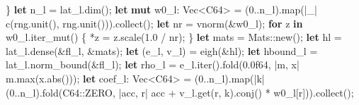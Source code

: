 \documentclass[
  10pt,
]{article}
\newenvironment{Shaded}{}{}
\newcommand{\ControlFlowTok}[1]{\textcolor[rgb]{0.00,0.44,0.13}{\textbf{#1}}}
\newcommand{\DataTypeTok}[1]{\textcolor[rgb]{0.56,0.13,0.00}{#1}}
\newcommand{\DecValTok}[1]{\textcolor[rgb]{0.25,0.63,0.44}{#1}}
\newcommand{\KeywordTok}[1]{\textcolor[rgb]{0.00,0.44,0.13}{\textbf{#1}}}
\newcommand{\NormalTok}[1]{#1}
\newcommand{\OperatorTok}[1]{\textcolor[rgb]{0.40,0.40,0.40}{#1}}
\newcommand{\PreprocessorTok}[1]{\textcolor[rgb]{0.74,0.48,0.00}{#1}}
\begin{document}
\begin{Shaded}
\begin{Highlighting}[]
    \OperatorTok{\}}
    \KeywordTok{let}\NormalTok{ n\_l }\OperatorTok{=}\NormalTok{ lat\_l}\OperatorTok{.}\NormalTok{dim()}\OperatorTok{;}
    \KeywordTok{let} \KeywordTok{mut}\NormalTok{ w0\_l}\OperatorTok{:} \DataTypeTok{Vec}\OperatorTok{\textless{}}\NormalTok{C64}\OperatorTok{\textgreater{}} \OperatorTok{=}\NormalTok{ (}\DecValTok{0}\OperatorTok{..}\NormalTok{n\_l)}\OperatorTok{.}\NormalTok{map(}\OperatorTok{|}\NormalTok{\_}\OperatorTok{|}\NormalTok{ c(rng}\OperatorTok{.}\NormalTok{unit()}\OperatorTok{,}\NormalTok{ rng}\OperatorTok{.}\NormalTok{unit()))}\OperatorTok{.}\NormalTok{collect()}\OperatorTok{;}
    \KeywordTok{let}\NormalTok{ nr }\OperatorTok{=}\NormalTok{ vnorm(}\OperatorTok{\&}\NormalTok{w0\_l)}\OperatorTok{;}
    \ControlFlowTok{for}\NormalTok{ z }\KeywordTok{in}\NormalTok{ w0\_l}\OperatorTok{.}\NormalTok{iter\_mut() }\OperatorTok{\{}
        \OperatorTok{*}\NormalTok{z }\OperatorTok{=}\NormalTok{ z}\OperatorTok{.}\NormalTok{scale(}\DecValTok{1.0} \OperatorTok{/}\NormalTok{ nr)}\OperatorTok{;}
    \OperatorTok{\}}
    \KeywordTok{let}\NormalTok{ mats }\OperatorTok{=} \PreprocessorTok{Mats::}\NormalTok{new()}\OperatorTok{;}
    \KeywordTok{let}\NormalTok{ hl }\OperatorTok{=}\NormalTok{ lat\_l}\OperatorTok{.}\NormalTok{dense(}\OperatorTok{\&}\NormalTok{fl\_l}\OperatorTok{,} \OperatorTok{\&}\NormalTok{mats)}\OperatorTok{;}
    \KeywordTok{let}\NormalTok{ (e\_l}\OperatorTok{,}\NormalTok{ v\_l) }\OperatorTok{=}\NormalTok{ eigh(}\OperatorTok{\&}\NormalTok{hl)}\OperatorTok{;}
    \KeywordTok{let}\NormalTok{ hbound\_l }\OperatorTok{=}\NormalTok{ lat\_l}\OperatorTok{.}\NormalTok{norm\_bound(}\OperatorTok{\&}\NormalTok{fl\_l)}\OperatorTok{;}
    \KeywordTok{let}\NormalTok{ rho\_l }\OperatorTok{=}\NormalTok{ e\_l}\OperatorTok{.}\NormalTok{iter()}\OperatorTok{.}\NormalTok{fold(}\DecValTok{0.0f64}\OperatorTok{,} \OperatorTok{|}\NormalTok{m}\OperatorTok{,}\NormalTok{ x}\OperatorTok{|}\NormalTok{ m}\OperatorTok{.}\NormalTok{max(x}\OperatorTok{.}\NormalTok{abs()))}\OperatorTok{;}
    \KeywordTok{let}\NormalTok{ coef\_l}\OperatorTok{:} \DataTypeTok{Vec}\OperatorTok{\textless{}}\NormalTok{C64}\OperatorTok{\textgreater{}} \OperatorTok{=}\NormalTok{ (}\DecValTok{0}\OperatorTok{..}\NormalTok{n\_l)}\OperatorTok{.}\NormalTok{map(}\OperatorTok{|}\NormalTok{k}\OperatorTok{|}\NormalTok{ (}\DecValTok{0}\OperatorTok{..}\NormalTok{n\_l)}\OperatorTok{.}\NormalTok{fold(}\PreprocessorTok{C64::}\NormalTok{ZERO}\OperatorTok{,} \OperatorTok{|}\NormalTok{acc}\OperatorTok{,}\NormalTok{ r}\OperatorTok{|}\NormalTok{ acc }\OperatorTok{+}\NormalTok{ v\_l}\OperatorTok{.}\NormalTok{get(r}\OperatorTok{,}\NormalTok{ k)}\OperatorTok{.}\NormalTok{conj() }\OperatorTok{*}\NormalTok{ w0\_l[r]))}\OperatorTok{.}\NormalTok{collect()}\OperatorTok{;}

\end{Highlighting}
\end{Shaded}
\end{document}

